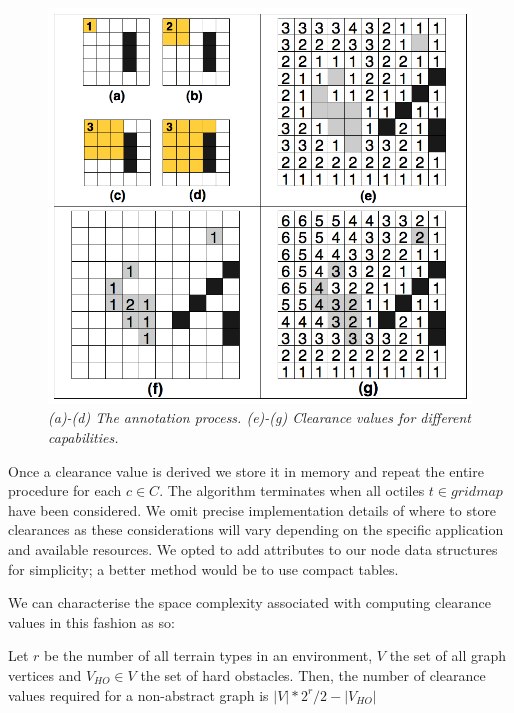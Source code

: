 \begin{figure}[htbp]
       \caption{\emph{(a)-(d) The annotation process. (e)-(g) Clearance values for different capabilities.}}
       \begin{center}
                       \includegraphics[scale=0.25]{diagrams/annotations.png}
       \end{center}
       \label{aha-fig:annotations}
\end{figure}

Once a clearance value is derived we store it in memory and repeat the entire procedure for each $c \in C$. The algorithm terminates when all octiles $t \in gridmap$ have been considered. 
We omit precise implementation details of where to store clearances as these considerations will vary depending on the specific application and available resources. We opted to add attributes to our node data structures for simplicity; a better method would be to use compact tables.
\par \indent
We can characterise the space complexity associated with computing clearance values in this fashion as so:
\begin{lemma}
\label{aha-lemma:numannotations}
Let $r$ be the number of all terrain types in an environment, $V$ the set of all graph vertices and $V_{HO} \in V$ the set of hard obstacles. Then, the number of clearance values required for a non-abstract graph is $|V|*2^r/2 - |V_{HO}|$
\end{lemma}

